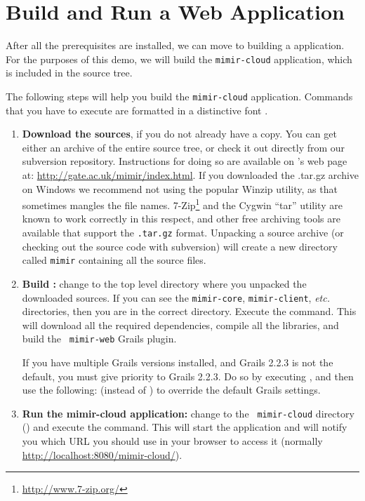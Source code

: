 \section{Build and Run a \Mimir{} Web Application}
%
After all the prerequisites are installed, we can move to building a \Mimir{}
application. For the purposes of this demo, we will build the {\tt mimir-cloud}
application, which is included in the source tree.

The following steps will help you build the {\tt mimir-cloud} application.
Commands that you have to execute are formatted in a distinctive font
.
\begin{enumerate}
  \item {\bf Download the \Mimir{} sources}, if you do not already have a copy.
  You can get either an archive of the entire source tree, or check it out
  directly from our subversion repository. Instructions for doing so are
  available on \Mimir{}'s web page at:
  \url{http://gate.ac.uk/mimir/index.html}.
  If you downloaded the .tar.gz archive on Windows we recommend not using the
  popular Winzip utility, as that sometimes mangles the file names. 
  7-Zip\footnote{\url{http://www.7-zip.org/}} and the Cygwin ``tar'' utility are
  known to work correctly in this respect, and other free archiving tools are 
  available that support the {\tt .tar.gz} format.
  Unpacking a source archive (or checking out the source code with subversion)
  will create a new directory called {\tt mimir} containing all the source
  files.
  \item {\bf Build \Mimir{}:} change to the top level directory where you
  unpacked the downloaded \Mimir{} sources. If you can see the {\tt mimir-core},
  {\tt mimir-client}, {\em etc.} directories, then you are in the correct
  directory. Execute the  command. This will download all the
  required dependencies, compile all the \Mimir{} libraries, and build the {\tt
  mimir-web} Grails plugin.
  
  If you have multiple Grails versions installed, and Grails 2.2.3 is not the
  default, you must give priority to Grails 2.2.3.  Do so by executing
  , and then use the following:
   (instead of ) to
  override the default Grails settings.
  \item {\bf Run the mimir-cloud application:}  change to the {\tt
  mimir-cloud} directory () and execute the  command. This will start the application and will notify you which
  URL you should use in your browser to access it (normally
  \url{http://localhost:8080/mimir-cloud/}).
\end{enumerate}
%
